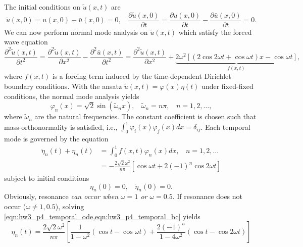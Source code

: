 The initial conditions on $\tilde{u}(x, t)$ are 
\begin{equation}
    \tilde{u}(x, 0) = u(x, 0) - \bar{u}(x, 0) = 0, ~~~~ \frac{\partial \tilde{u}(x, 0)}{\partial t} = \frac{\partial u(x, 0)}{\partial t} - \frac{\partial \bar{u}(x, 0)}{\partial t} = 0.
\end{equation}
We can now perform normal mode analysis on $\tilde{u}(x, t)$ which satisfy the forced wave equation 
\begin{equation}
    \frac{\partial^2 \tilde{u}(x, t)}{\partial t^2} = \frac{\partial^2 \tilde{u}(x, t)}{\partial x^2} - \frac{\partial^2 \bar{u}(x, t)}{\partial t^2} = \frac{\partial^2 \tilde{u}(x, t)}{\partial x^2} + \underbrace{2\omega^2 \left[(2\cos2\omega t + \cos\omega t) x - \cos\omega t \right]}_{f(x, t)},
\end{equation}
where $f(x, t)$ is a forcing term induced by the time-dependent Dirichlet boundary conditions. 
With the ansatz $\tilde{u}(x, t) = \varphi(x) \eta(t)$ under fixed-fixed conditions, the normal mode analysis yields 
\begin{equation}\label{eqn:hw3_p4_spatial_soln}
    \varphi_n(x) = \sqrt{2}\sin(\tilde{\omega}_n x), ~~~~ \tilde{\omega}_n = n\pi, ~~~~ n = 1, 2, \ldots,
\end{equation}
where $\tilde{\omega}_n$ are the natural frequencies. 
The constant coefficient is chosen such that mass-orthonormality is satisfied, i.e., $\int_0^1 \varphi_i(x) \varphi_j(x) dx = \delta_{ij}$.
Each temporal mode is governed by the equation 
\begin{equation}\label{eqn:hw3_p4_temporal_ode}
\begin{aligned}
    \ddot{\eta}_n(t) + \eta_n(t) &= \int_0^1 f(x, t) \varphi_n(x) dx, ~~~~ n = 1, 2, \ldots \\
    &= -\frac{2\sqrt{2} \omega^2}{n\pi} [\cos\omega t + 2{(-1)}^n \cos2\omega t]
\end{aligned}
\end{equation}
subject to initial conditions 
\begin{equation}\label{eqn:hw3_p4_temporal_bc}
    \eta_n(0) = 0, ~~~~ \dot{\eta}_n(0) = 0.
\end{equation}
Obviously, resonance \emph{can occur when $\omega = 1$ or $\omega = 0.5$}.
If resonance does not occur ($\omega \neq 1, 0.5$), solving \cref{eqn:hw3_p4_temporal_ode,eqn:hw3_p4_temporal_bc} yields 
\begin{equation}\label{eqn:hw3_p4_temporal_soln_no_resonance}
    \eta_n(t) = \frac{2\sqrt{2}\omega^2}{n\pi}\left[\frac{1}{1-\omega^2}(\cos t - \cos\omega t) + \frac{2{(-1)}^n}{1 - 4\omega^2}(\cos t - \cos 2 \omega t) \right]
\end{equation}
